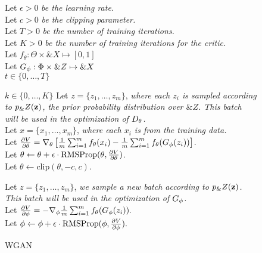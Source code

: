 \begin{figure}[H]
  \centering
  \begin{minipage}{\linewidth}
    \begin{algorithm}[H]
      Let $\epsilon > 0$ \textit{be the learning rate.} \\
      Let $c > 0$ \textit{be the clipping parameter.} \\
      Let $T > 0$ \textit{be the number of training iterations.} \\
      Let $K > 0$ \textit{be the number of training iterations for the
        critic.} \\
      Let $f_\theta: \Theta \times \&X \mapsto [0, 1]$ \\
      Let $G_\phi: \Phi \times \&Z \mapsto \&X$ \\
      \For%
      {$t \in \{0, \dots, T\}$} {
        \For%
        {$k \in \{0, \dots, K\}$} {
          Let
          $z = \{z_1, \dots, z_m\}$, \textit{where each
            $z_i$ is sampled according to $p_\&Z(\mathbf{z})$, the prior
            probability distribution over $\&Z$.  This batch will be
            used in the optimization of
            $D_\theta$.} \\
          Let
          $x = \{x_1, \dots, x_m\}$, \textit{where each
            $x_i$ is from the training data.} \\
          Let
          ${\partial{V} \over \partial{\theta}} = \nabla_\theta\left[
            {1 \over m} \sum_{i=1}^m f_{\theta}(x_i) - {1 \over m}
            \sum_{i=1}^m f_{\theta}(G_\phi(z_i))\right]$. \\
          Let
          $\theta \gets \theta + \epsilon \cdot \text{RMSProp}(\theta,
          {\partial{V} \over \partial{\theta}})$. \\

          Let $\theta \gets \text{clip}(\theta, -c, c)$.
        }

        Let $z = \{z_1, \dots, z_m\}$, \textit{we sample a new
          batch according to $p_\&Z(\mathbf{z})$. This batch will be used in the
          optimization of
          $G_\phi$.} \\

        Let
        ${\partial{V} \over \partial{\phi}} = - \nabla_\phi{1 \over m}
        \sum_{i=1}^m f_{\theta}(G_\phi(z_i)).$ \\

        Let
        $\phi \gets \phi + \epsilon \cdot \text{RMSProp}(\phi,
        {\partial{V} \over \partial{\phi}}).$ \\
      }
      \caption{WGAN}
      \label{algo:wgawgann-algo}
    \end{algorithm}
  \end{minipage}
\end{figure}

